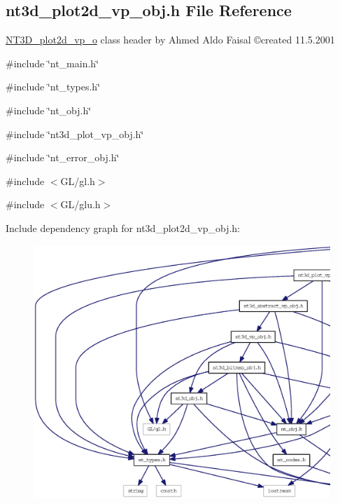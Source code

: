 \subsection{nt3d\_\-plot2d\_\-vp\_\-obj.h File Reference}
\label{nt3d__plot2d__vp__obj_8h}



\begin{DoxyItemize}
\item \hyperlink{class_n_t3_d__plot2d__vp__o}{NT3D\_\-plot2d\_\-vp\_\-o} class header by Ahmed Aldo Faisal \copyright created 11.5.2001 
\end{DoxyItemize} 


{\ttfamily \#include \char`\"{}nt\_\-main.h\char`\"{}}\par
{\ttfamily \#include \char`\"{}nt\_\-types.h\char`\"{}}\par
{\ttfamily \#include \char`\"{}nt\_\-obj.h\char`\"{}}\par
{\ttfamily \#include \char`\"{}nt3d\_\-plot\_\-vp\_\-obj.h\char`\"{}}\par
{\ttfamily \#include \char`\"{}nt\_\-error\_\-obj.h\char`\"{}}\par
{\ttfamily \#include $<$GL/gl.h$>$}\par
{\ttfamily \#include $<$GL/glu.h$>$}\par
Include dependency graph for nt3d\_\-plot2d\_\-vp\_\-obj.h:
\nopagebreak
\begin{figure}[H]
\begin{center}
\leavevmode
\includegraphics[width=400pt]{nt3d__plot2d__vp__obj_8h__incl}
\end{center}
\end{figure}
